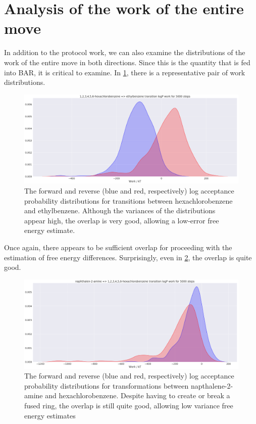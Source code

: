 \section{Analysis of the work of the entire move}
%
In addition to the protocol work, we can also examine the distributions of the work of the entire move in both directions.
%
Since this is the quantity that is fed into BAR, it is critical to examine.
%
In \ref{fig:worka}, there is a representative pair of work distributions.
%
\begin{figure}
    \centering
    \includegraphics[width=1.0\textwidth]{hexachlor-ethylbenz.png}
    \caption{The forward and reverse (blue and red, respectively) log acceptance probability distributions for transitions between hexachlorobenzene and ethylbenzene. Although the variances of the distributions appear high, the overlap is very good, allowing a low-error free energy estimate.}
    \label{fig:worka}
\end{figure}
%
%
Once again, there appears to be sufficient overlap for proceeding with the estimation of free energy differences.
%
Surprisingly, even in \ref{fig:workb}, the overlap is quite good.
%
\begin{figure}
    \centering
    \includegraphics[width=1.0\textwidth]{napthamine-hexachlor.png}
    \caption{The forward and reverse (blue and red, respectively) log acceptance probability distributions for transformations between napthalene-2-amine and hexachlorobenzene. Despite having to create or break a fused ring, the overlap is still quite good, allowing low variance free energy estimates}
    \label{fig:workb}
\end{figure}
%
